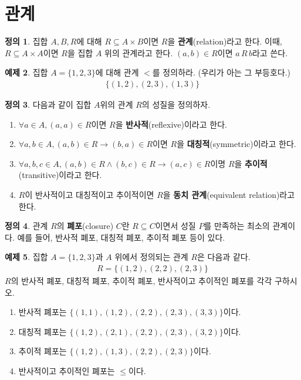 \documentclass[b5paper, 10pt]{book}
\theoremstyle{definition}
\newtheorem{defn}{정의}[chapter]
\newtheorem{ex}[defn]{예제}
\begin{document}
\section{관계}
\begin{defn}
    집합 $A, B, R$에 대해 $R \subseteq A \times B$이면 $R$을 \textbf{관계}(relation)라고 한다.
    이때, $R \subseteq A \times A$이면 $R$을 집합 $A$ 위의 관계라고 한다. 
    $(a, b) \in R$이면 $a \, R \, b$라고 쓴다.
\end{defn}
\begin{ex}
    집합 $A = \{1, 2, 3\}$에 대해 관계 $<$를 정의하라. (우리가 아는 
    그 부등호다.)
    \begin{align*}
        \{(1, 2), (2, 3), (1, 3)\}
    \end{align*}
\end{ex}
\begin{defn}
    다음과 같이 집합 $A$위의 관계 $R$의 성질을 정의하자.
    \begin{enumerate}
        \item $\forall a \in A, (a, a) \in R$이면 $R$을 \textbf{반사적}(reflexive)이라고 한다.
        \item $\forall a, b \in A, (a, b) \in R \rightarrow (b, a) \in R$이면
        $R$을 \textbf{대칭적}(symmetric)이라고 한다.
        \item $\forall a, b, c\in A, (a, b) \in R \wedge (b, c) \in R \rightarrow 
        (a, c) \in R$이명 $R$을 \textbf{추이적}(transitive)이라고 한다.
        \item $R$이 반사적이고 대칭적이고 추이적이면 $R$을 \textbf{동치 관계}(equivalent relation)라고
        한다.
    \end{enumerate}
\end{defn}
\begin{defn}
    관계 $R$의 \textbf{폐포}(closure) $C$란 $R \subseteq C$이면서 성질 $P$를 만족하는 최소의
    관계이다. 예를 들어, 반사적 폐포, 대칭적 폐포, 추이적 폐포 등이 있다. 
\end{defn}
\begin{ex}
    집합 $A = \{1, 2, 3\}$과 $A$ 위에서 정의되는 관계 $R$은 다음과 같다.
    \begin{align*}
        R = \{(1,2), (2, 2), (2, 3)\}
    \end{align*}
    $R$의 반사적 폐포, 대칭적 폐포, 추이적 폐포, 반사적이고 추이적인 폐포를 각각 구하시오.
    \begin{enumerate}
        \item 반사적 폐포는 $\{(1, 1), (1, 2), (2, 2), (2, 3), (3, 3)\}$이다.
        \item 대칭적 폐포는 $\{(1, 2), (2, 1), (2, 2), (2, 3), (3, 2)\}$이다.
        \item 추이적 폐포는 $\{(1, 2),(1, 3), (2, 2), (2, 3) \}$이다.
        \item 반사적이고 추이적인 폐포는 $\le$이다. 
    \end{enumerate}
\end{ex}
\end{document}
